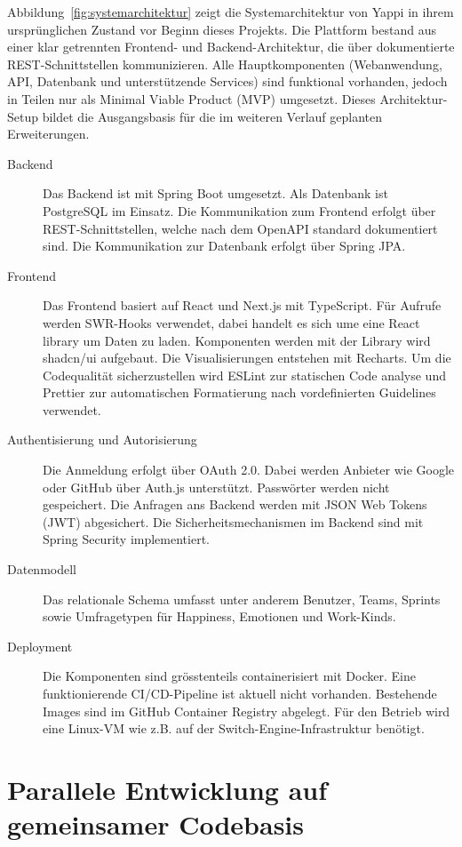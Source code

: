 \documentclass[12pt,a4paper]{report}
\begin{document}
Abbildung~\ref{fig:systemarchitektur} zeigt die Systemarchitektur von Yappi in ihrem ursprünglichen Zustand vor Beginn dieses
Projekts. Die Plattform bestand aus einer klar getrennten Frontend- und Backend-Architektur, die über dokumentierte
REST-Schnittstellen kommunizieren. Alle Hauptkomponenten (Webanwendung, API, Datenbank und unterstützende Services) sind 
funktional vorhanden, jedoch in Teilen nur als Minimal Viable Product (MVP) umgesetzt. Dieses Architektur-Setup bildet die
Ausgangsbasis für die im weiteren Verlauf geplanten Erweiterungen.

\begin{description}
  \item[Backend] Das Backend ist mit Spring Boot umgesetzt. Als Datenbank ist PostgreSQL im Einsatz. Die Kommunikation zum Frontend
    erfolgt über REST-Schnittstellen, welche nach dem OpenAPI standard dokumentiert sind. Die Kommunikation zur Datenbank erfolgt
    über Spring JPA.
  \item[Frontend] Das Frontend basiert auf React und Next.js mit TypeScript. Für Aufrufe werden SWR-Hooks verwendet, dabei handelt
    es sich ume eine React library um Daten zu laden. Komponenten werden mit der Library wird shadcn/ui aufgebaut. Die 
    Visualisierungen entstehen mit Recharts. Um die Codequalität sicherzustellen wird ESLint zur statischen Code analyse und 
    Prettier zur automatischen Formatierung nach vordefinierten Guidelines verwendet.
  \item[Authentisierung und Autorisierung] Die Anmeldung erfolgt über OAuth 2.0. Dabei werden Anbieter wie Google oder GitHub 
    über Auth.js unterstützt. Passwörter werden nicht gespeichert. Die Anfragen ans Backend werden mit JSON Web Tokens (JWT)
    abgesichert. Die Sicherheitsmechanismen im Backend sind mit Spring Security implementiert.
  \item[Datenmodell] Das relationale Schema umfasst unter anderem Benutzer, Teams, Sprints sowie Umfragetypen für Happiness,
    Emotionen und Work-Kinds.
  \item[Deployment] Die Komponenten sind grösstenteils containerisiert mit Docker. Eine funktionierende CI/CD-Pipeline ist aktuell
    nicht vorhanden. Bestehende Images sind im GitHub Container Registry abgelegt. Für den Betrieb wird eine Linux-VM wie z.B. auf
    der Switch-Engine-Infrastruktur benötigt.
\end{description}

\section{Parallele Entwicklung auf gemeinsamer Codebasis}
\end{document}

